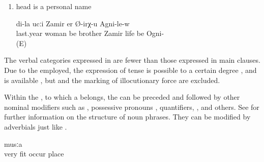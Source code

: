 \begin{enumerate}
	\item	head is a personal name
	\begin{exe}
		\ex	\label{ex:My brother Zamir, who married last year, lives in Ogni}
			di-la	ucːi	Zamir	er	Ø-irχ-u	Agni-le-w\\
			last.year	woman	be		brother	Zamir	life	be	Ogni-\\
		\glt	{} (E)
	\end{exe}
\end{enumerate}

The verbal categories expressed in  are fewer than those expressed in main clauses. Due to the  employed, the expression of tense is possible to a certain degree ,  and  is available , but  and the marking of illocutionary force are excluded. 

Within the , to which a  belongs, the  can be preceded and followed by other nominal modifiers such as  , possessive pronouns , quantifiers, , and others. See  for further information on the structure of noun phrases. They can be modified by adverbials just like  .
%
\begin{exe}
	\ex	\label{ex:‎a very fitting (= good) place}
	\gll	[c'aq'-le	b-al	b-ič-ib]	musːa	\\
		very	fit	occur	place\\
	\glt	\sqt{‎a very fitting (= good) place}
\end{exe}

